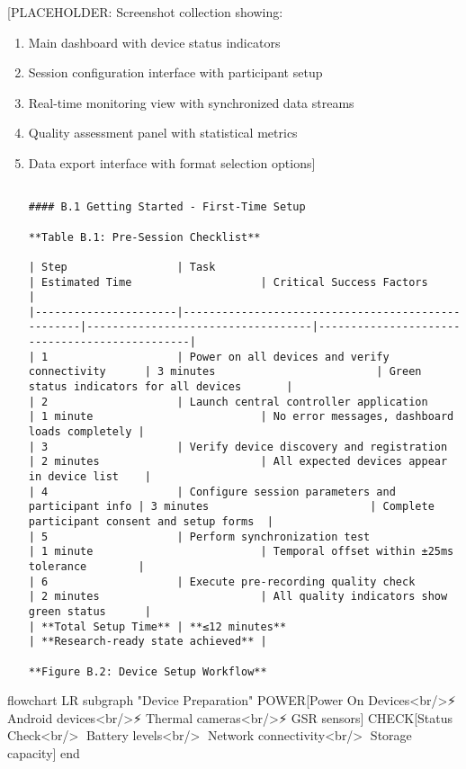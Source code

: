 \documentclass[12pt,a4paper]{report}
\begin{document}
\begin{verbatim}
\end{verbatim}
[PLACEHOLDER: Screenshot collection showing:
\begin{enumerate}
\item Main dashboard with device status indicators
\item Session configuration interface with participant setup
\item Real-time monitoring view with synchronized data streams
\item Quality assessment panel with statistical metrics
\item Data export interface with format selection options]
\begin{verbatim}

#### B.1 Getting Started - First-Time Setup

**Table B.1: Pre-Session Checklist**

| Step                 | Task                                              | Estimated Time                    | Critical Success Factors                      |
|----------------------|---------------------------------------------------|-----------------------------------|-----------------------------------------------|
| 1                    | Power on all devices and verify connectivity      | 3 minutes                         | Green status indicators for all devices       |
| 2                    | Launch central controller application             | 1 minute                          | No error messages, dashboard loads completely |
| 3                    | Verify device discovery and registration          | 2 minutes                         | All expected devices appear in device list    |
| 4                    | Configure session parameters and participant info | 3 minutes                         | Complete participant consent and setup forms  |
| 5                    | Perform synchronization test                      | 1 minute                          | Temporal offset within ±25ms tolerance        |
| 6                    | Execute pre-recording quality check               | 2 minutes                         | All quality indicators show green status      |
| **Total Setup Time** | **≤12 minutes**                                   | **Research-ready state achieved** |

**Figure B.2: Device Setup Workflow**

\end{verbatim}
\end{enumerate}
flowchart LR
subgraph "Device Preparation"
POWER[Power On Devices<br/>⚡ Android devices<br/>⚡ Thermal cameras<br/>⚡ GSR sensors]
CHECK[Status Check<br/>📱 Battery levels<br/>📶 Network connectivity<br/>💾 Storage capacity]
end
\end{document}
